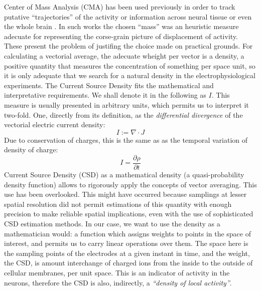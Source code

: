 \documentclass{article}
\begin{document}
Center of Mass Analysis (CMA) has been used previously in order to track putative  ``trajectories'' of the activity or information across neural tissue or even the whole brain \cite{Chao05, Chao07, Manjarrez07, Manjarrez09}. In such works the chosen ``mass'' was an heuristic measure adecuate for representing the corse-grain picture of displacement of activity. These present the problem of justifing the choice made on practical grounds. For calculating a vectorial average, the adecuate wheight per vector is a density, a positive quantity that measures the concentration of something per space unit, so it is only adequate that we search for a natural density in the electrophysiological experiments. The Current Source Density fits the mathematical and interpretative requirements. We shall denote it in the following as $I$.  This measure is usually presented in arbitrary units, which permits us to interpret it two-fold. One, directly from its definition, as the \emph{differential divergence} of the vectorial electric current density:
\begin{equation}
  I:=\nabla \cdot J
\end{equation}
Due to conservation of charges, this is the same as as the temporal variation of density of charge:
\begin{equation}
  I=\frac{\partial \rho}{\partial t}
\end{equation}
Current Source Density (CSD) as a mathematical density (a quasi-probability density function)  allows  to rigorously apply the concepts of vector averaging. This use has been overlooked. This might have occurred because  samplings at lesser spatial resolution did not permit estimations of this quantity with enough precision to make reliable spatial implications, even with the use of sophisticated CSD estimation methods. In our case, we want to use the density as a mathematician would: a function which assigns weights to points in the space of interest, and permits us to carry linear operations over them.  The space here is the sampling points of the electrodes at a given instant in time, and the weight, the CSD, is amount interchange of charged ions from the inside to the outside of cellular membranes, per unit space.  This is an indicator of activity in the neurons, therefore the CSD is also, indirectly, a \emph{``density of local activity''}.
\end{document}
